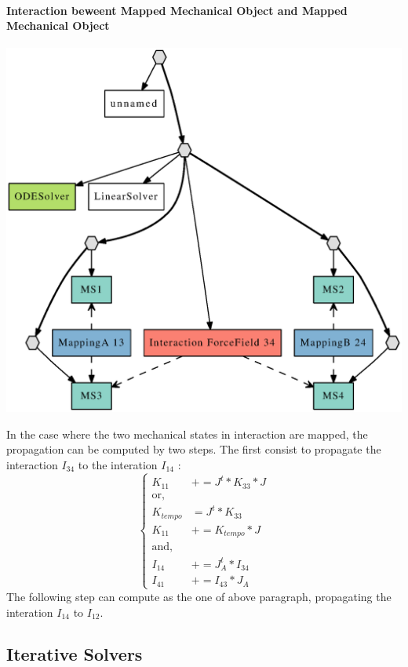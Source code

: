 \documentclass[a4paper,10pt]{article}
\begin{document}
\paragraph{Interaction beweent Mapped Mechanical Object and Mapped Mechanical Object}
\begin{center}
  \includegraphics[scale=0.3]{interaction_Mapped_Mapped}
\end{center}
In the case where the two mechanical states in interaction are mapped, the propagation can be computed by two steps. The first consist to propagate the interaction $I_{34}$ to the interation $I_{14}$ :
\[
\left\{ 
\begin{array}{ll}
K_{11}       & += J^t * K_{33} * J               \\
\text{or,}   &                                   \\
K_{tempo}    & =  J^t * K_{33}                   \\
K_{11}       & += K_{tempo} * J                  \\ 
\text{and,}&                 \\      
I_{14}       & += J^t_A * I_{34}                  \\ 
I_{41}       & += I_{43} * J_A                        
\end{array}
\right.
\]
The following step can compute as the one of above paragraph, propagating the interation $I_{14}$ to $I_{12}$.
\subsection{Iterative Solvers }
\end{document}
